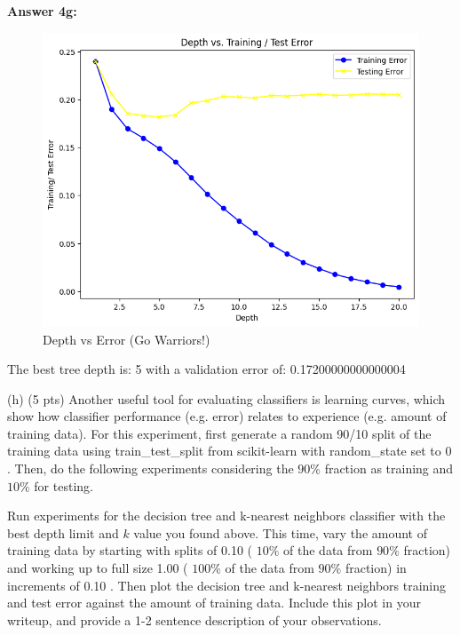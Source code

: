 \documentclass[10pt]{article}
\begin{document}
\hspace{1 cm}

\begin{flushleft}

\textbf{Answer 4g:}

\begin{figure}[H]
\centering
\includegraphics[width=1\textwidth]{images/depth_vs_error.png}
\caption{Depth vs Error (Go Warriors!)}
\label{fig:Depth}
\end{figure}

The best tree depth is: 5 with a validation error of: 0.17200000000000004
    
\end{flushleft}

(h) (5 pts) Another useful tool for evaluating classifiers is learning curves, which show how classifier performance (e.g. error) relates to experience (e.g. amount of training data). For this experiment, first generate a random 90/10 split of the training data using train\_test\_split from scikit-learn with random\_state set to 0 . Then, do the following experiments considering the $90 \%$ fraction as training and $10 \%$ for testing.

Run experiments for the decision tree and k-nearest neighbors classifier with the best depth limit and $k$ value you found above. This time, vary the amount of training data by starting with splits of 0.10 ( $10 \%$ of the data from $90 \%$ fraction) and working up to full size 1.00 ( $100 \%$ of the data from $90 \%$ fraction) in increments of 0.10 . Then plot the decision tree and $\mathrm{k}$-nearest neighbors training and test error against the amount of training data. Include this plot in your writeup, and provide a 1-2 sentence description of your observations.
\end{document}
